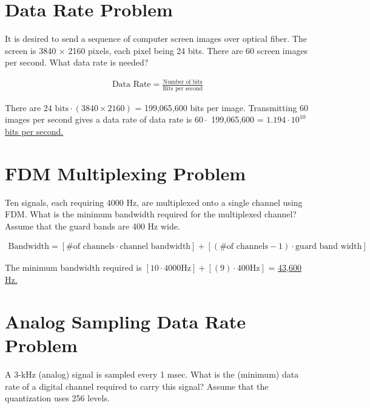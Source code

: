 
\section{Data Rate Problem}
It is desired to send a sequence of computer screen images over optical fiber. The screen is 3840 $\times$ 2160 pixels, each pixel being 24 bits. There are 60 screen images per second. What data rate is needed?

\begin{align*}
	\text{Data Rate} = \frac{\text{Number of bits}}{\text{Bits per second}}
\end{align*}
\vspace{4pt}

There are $24 \text{ bits} \cdot (3840 \times 2160)$ = 199,065,600 bits per image. Transmitting 60 images per second gives a data rate of data rate is $60 \cdot $ 199,065,600 = \ul{$1.194 \cdot 10^{10}$ bits per second.}

\clearpage
\section{FDM Multiplexing Problem}
Ten signals, each requiring 4000 Hz, are multiplexed onto a single channel using FDM. What is the minimum bandwidth required for the multiplexed channel? Assume that the guard bands are 400 Hz wide.

\begin{align*}
	\text{Bandwidth} = [\text{\# of channels} \cdot \text{channel bandwidth}] + [(\text{\# of channels} - 1) \cdot \text{guard band width}]
\end{align*}
\vspace{4pt}

The minimum bandwidth required is $[10 \cdot 4000 \text{Hz}] + [(9) \cdot 400 \text{Hz}]$ = \ul{43,600 Hz.}

\clearpage
\section{Analog Sampling Data Rate Problem}
A 3-kHz (analog) signal is sampled every 1 msec. What is the (minimum) data rate of a digital channel required to carry this signal? Assume that the quantization uses 256 levels.


\clearpage
\section{}

\clearpage
\section{}

\clearpage
\section{}

\clearpage
\section{}

\raggedbottom
